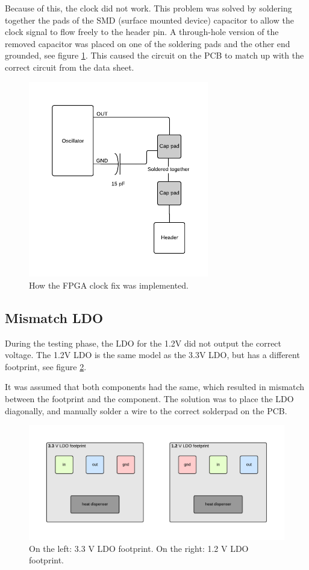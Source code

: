 \documentclass[../main/report.tex]{subfiles}
\begin{document}
Because of this, the clock did not work.
This problem was solved by soldering together the pads of the SMD (surface mounted device) capacitor to allow the clock signal to flow freely to the header pin.
A through-hole version of the removed capacitor was placed on one of the soldering pads and the other end grounded, see figure \ref{fig:pcb-clock-fix}.
This caused the circuit on the PCB to match up with the correct circuit from the data sheet.

\begin{figure}[H]
    \centering
    \includegraphics[width=0.7\textwidth]{../pcb/assets/pcb-clock-fix.pdf}
    \caption{How the FPGA clock fix was implemented.}
    \label{fig:pcb-clock-fix}
\end{figure}

\subsection*{Mismatch LDO}
During the testing phase, the LDO for the 1.2V did not output the correct voltage.
The 1.2V LDO is the same model as the 3.3V LDO, but has a different
footprint, see figure \ref{fig:ldo-footprints}.

It was assumed that both components had the same, which resulted in mismatch between the footprint and the component.
The solution was to place the LDO diagonally,  and manually solder a wire to the correct solderpad on the PCB. 

\begin{figure}[H]
    \centering
    \includegraphics[width=\textwidth]{../pcb/assets/ldo-footprints.pdf}
    \caption{On the left: 3.3 V LDO footprint. On the right: 1.2 V LDO footprint.}
    \label{fig:ldo-footprints}
\end{figure}
\end{document}
